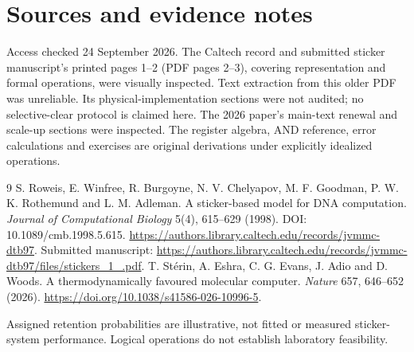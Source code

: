 \chapter*{Sources and evidence notes}
Access checked 24 September 2026. The Caltech record and submitted sticker
manuscript's printed pages 1--2 (PDF pages 2--3), covering representation
and formal operations, were visually inspected. Text extraction from this
older PDF was unreliable. Its physical-implementation sections were not
audited; no selective-clear protocol is claimed here.
The 2026 paper's main-text renewal and scale-up sections were inspected.
The register algebra, AND reference, error calculations and exercises are
original derivations under explicitly idealized operations.
\begingroup\let\chapter\section
\begin{thebibliography}{9}
 S. Roweis, E. Winfree, R. Burgoyne, N. V. Chelyapov,
M. F. Goodman, P. W. K. Rothemund and L. M. Adleman.
A sticker-based model for DNA computation.
\emph{Journal of Computational Biology} 5(4), 615--629 (1998).
DOI: 10.1089/cmb.1998.5.615.
\url{https://authors.library.caltech.edu/records/jvmmc-dtb97}.
Submitted manuscript:
\url{https://authors.library.caltech.edu/records/jvmmc-dtb97/files/stickers_1_.pdf}.
 T. Stérin, A. Eshra, C. G. Evans, J. Adio and D. Woods.
A thermodynamically favoured molecular computer.
\emph{Nature} 657, 646--652 (2026).
\url{https://doi.org/10.1038/s41586-026-10996-5}.
\end{thebibliography}
\endgroup
Assigned retention probabilities are illustrative, not fitted or measured
sticker-system performance. Logical operations do not establish laboratory
feasibility.
